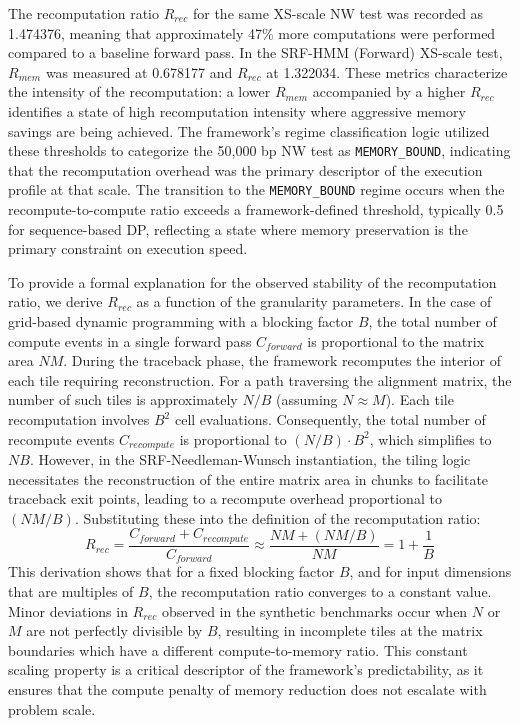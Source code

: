 The recomputation ratio $R_{rec}$ for the same XS-scale NW test was recorded as 1.474376, meaning that approximately 47\% more computations were performed compared to a baseline forward pass. In the SRF-HMM (Forward) XS-scale test, $R_{mem}$ was measured at 0.678177 and $R_{rec}$ at 1.322034. These metrics characterize the intensity of the recomputation: a lower $R_{mem}$ accompanied by a higher $R_{rec}$ identifies a state of high recomputation intensity where aggressive memory savings are being achieved. The framework's regime classification logic utilized these thresholds to categorize the 50,000 bp NW test as \texttt{MEMORY\_BOUND}, indicating that the recomputation overhead was the primary descriptor of the execution profile at that scale. The transition to the \texttt{MEMORY\_BOUND} regime occurs when the recompute-to-compute ratio exceeds a framework-defined threshold, typically 0.5 for sequence-based DP, reflecting a state where memory preservation is the primary constraint on execution speed.

To provide a formal explanation for the observed stability of the recomputation ratio, we derive $R_{rec}$ as a function of the granularity parameters. In the case of grid-based dynamic programming with a blocking factor $B$, the total number of compute events in a single forward pass $C_{forward}$ is proportional to the matrix area $NM$. During the traceback phase, the framework recomputes the interior of each tile requiring reconstruction. For a path traversing the alignment matrix, the number of such tiles is approximately $N/B$ (assuming $N \approx M$). Each tile recomputation involves $B^2$ cell evaluations. Consequently, the total number of recompute events $C_{recompute}$ is proportional to $(N/B) \cdot B^2$, which simplifies to $NB$. However, in the SRF-Needleman-Wunsch instantiation, the tiling logic necessitates the reconstruction of the entire matrix area in chunks to facilitate traceback exit points, leading to a recompute overhead proportional to $(NM/B)$. Substituting these into the definition of the recomputation ratio:
\begin{equation}
R_{rec} = \frac{C_{forward} + C_{recompute}}{C_{forward}} \approx \frac{NM + (NM/B)}{NM} = 1 + \frac{1}{B}
\end{equation}
This derivation shows that for a fixed blocking factor $B$, and for input dimensions that are multiples of $B$, the recomputation ratio converges to a constant value. Minor deviations in $R_{rec}$ observed in the synthetic benchmarks occur when $N$ or $M$ are not perfectly divisible by $B$, resulting in incomplete tiles at the matrix boundaries which have a different compute-to-memory ratio. This constant scaling property is a critical descriptor of the framework's predictability, as it ensures that the compute penalty of memory reduction does not escalate with problem scale.

